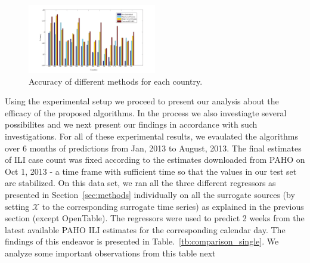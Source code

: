 
\begin{figure}[h]
\centering
\includegraphics[width=0.5\textwidth]{fig/accs}
\caption{Accuracy of different methods for each country.}
\label{fig:accuracies}
\end{figure}

Using the experimental setup we proceed to present our analysis about the efficacy 
of the proposed algorithms. In the process we also investiagte several possibilites 
and we next present our findings in accordance with such investigations. For all of 
these experimental results, we evaulated the algorithms over 6 months of predictions 
from Jan, 2013 to August, 2013. The final estimates of ILI case count was fixed according
to the estimates downloaded from PAHO on Oct 1, 2013 - a time frame with sufficient time
so that the values in our test set are stabilized. On this data set, we ran all the three different 
regressors as presented in Section~\ref{sec:methods} individually on all the surrogate sources (by setting
$\mathcal{X}$ to the corresponding surrogate time series)
as explained in the previous section (except OpenTable). The regressors were used to predict
2 weeks from the latest available PAHO ILI estimates for the corresponding calendar day. 
The findings of this endeavor is presented in Table.~\ref{tb:comparison_single}. We analyze 
some important observations from this table next


